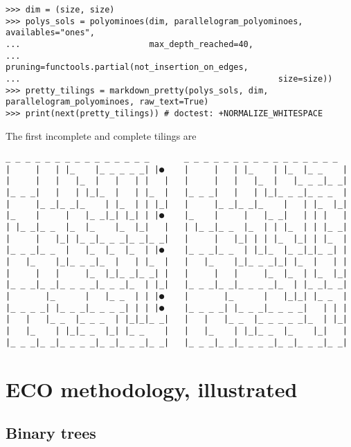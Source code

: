 \begin{verbatim}
>>> dim = (size, size)
>>> polys_sols = polyominoes(dim, parallelogram_polyominoes, availables="ones",
...                          max_depth_reached=40,
...                          pruning=functools.partial(not_insertion_on_edges,
...                                                    size=size))
>>> pretty_tilings = markdown_pretty(polys_sols, dim, parallelogram_polyominoes, raw_text=True)
>>> print(next(pretty_tilings)) # doctest: +NORMALIZE_WHITESPACE
\end{verbatim}
The first incomplete and complete tilings are
\begin{Verbatim}[baselinestretch=0.1, fontsize=\small]
 _ _ _ _ _ _ _ _ _ _ _ _ _ _ _       _ _ _ _ _ _ _ _ _ _ _ _ _ _ _ _
|     |   | |_    |_ _ _ _ _| |●    |     |   | |_    | |_  |_ _    |
|     |   |   |_  |   |   | |   |   |     |   |   |_  |   |_ _ _|_ _|
|_ _ _|   |   | |_|_  |   | |_  |   |_ _ _|   |   | |_|_ _ _|_ _ _  |
|     |_ _|_ _|_    | |_  | | |_|   |     |_ _|_ _|_    |   | |_  |_|
|_    |     |   |_ _|_| |_| | |●    |_    |     |   |_ _|   | | |   |
| |_ _|_ _  |_  |_    |_  |_|   |   | |_ _|_ _  |_  | | |_  | | |_ _|
|     |   |_| |_ _|_ _ _|_ _|_ _|   |     |   |_| | | |_  |_| | |_  |
|_ _ _|_ _  |   |_  |_  |_  | |●    |_ _ _|_ _  | |_|_  |_ _|_|_ _| |
|   |_    |_|_ _ _|_  |   | |_  |   |   |_    |_|_ _ _|_| |_  |   | |
|     |   |     |_  |_|_ _|_ _| |   |     |   |     |_  |_  | |_  |_|
|_ _ _|_ _|_ _ _ _|_ _ _|_  | |_|   |_ _ _|_ _|_ _ _ _|_  | |_ _|_ _|
|       |_      |   |_ _  | | |●    |       |_      |   |_|_| |_ _  |
|_ _ _ _| |_ _ _|_ _ _ _| | | |●    |_ _ _ _| |_ _ _|_ _ _ _|   | | |
|   |   |_ _  |_ _ _  | |_|_|_ _|   |   |   |_ _  |_ _ _ _ _|_  | |_|
|   |_    | |_|_ _  |_| |_ _    |   |   |_    | |_|_ _  |_    |_|   |
|_ _ _|_ _|_ _ _ _|_ _|_ _ _|_ _|   |_ _ _|_ _|_ _ _ _|_ _|_ _ _|_ _|
\end{Verbatim}


\section{ECO methodology, illustrated}

\newpage
\subsection{Binary trees}



